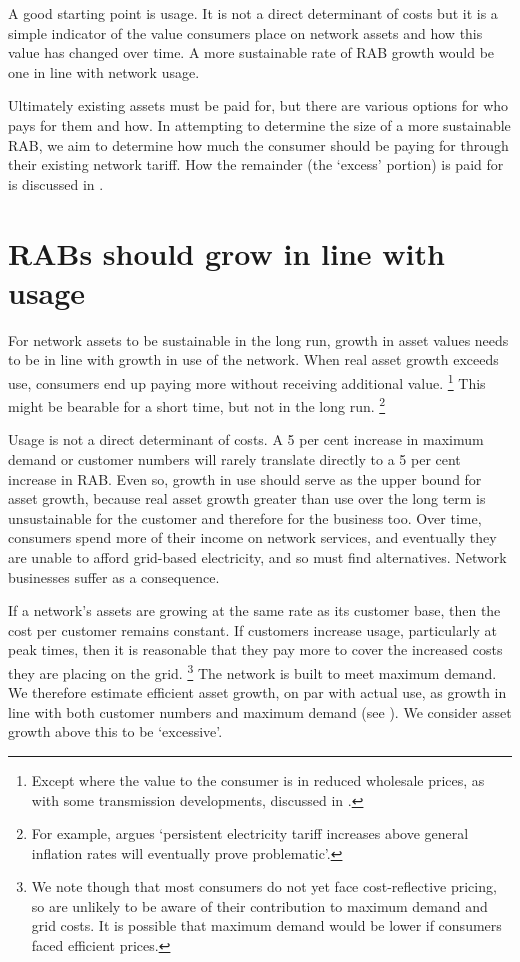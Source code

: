 \documentclass[FrontPage]{grattan}
\begin{document}
A good starting point is usage. It is not a direct determinant of costs but it is a simple indicator of the value consumers place on network assets and how this value has changed over time. A more sustainable rate of RAB growth would be one in line with network usage.

Ultimately existing assets must be paid for, but there are various options for who pays for them and how. In attempting to determine the size of a more sustainable RAB, we aim to determine how much the consumer should be paying for through their existing network tariff. How the remainder (the `excess' portion) is paid for is discussed in .

\section{RABs should grow in line with usage}\label{sec:RABs-should-grow-in-line-with-usage}

For network assets to be sustainable in the long run, growth in asset values needs to be in line with growth in use of the network. When real asset growth exceeds use, consumers end up paying more without receiving additional value.%
\footnote{Except where the value to the consumer is in reduced wholesale prices, as with some transmission developments, discussed in .}
This might be bearable for a short time, but not in the long run.%
\footnote{For example, \textcite{simshauser2017monopoly} argues `persistent electricity tariff increases above general inflation rates will eventually prove problematic'.}

Usage is not a direct determinant of costs. A 5 per cent increase in maximum demand or customer numbers will rarely translate directly to a 5 per cent increase in RAB\@. Even so, growth in use should serve as the upper bound for asset growth, because real asset growth greater than use over the long term is unsustainable for the customer and therefore for the business too. Over time, consumers spend more of their income on network services, and eventually they are unable to afford grid-based electricity, and so must find alternatives. Network businesses suffer as a consequence.

If a network's assets are growing at the same rate as its customer base, then the cost per customer remains constant. If customers increase usage, particularly at peak times, then it is reasonable that they pay more to cover the increased costs they are placing on the grid.%
\footnote{We note though that most consumers do not yet face cost-reflective pricing, so are unlikely to be aware of their contribution to maximum demand and grid costs. It is possible that maximum demand would be lower if consumers faced efficient prices.}
The network is built to meet maximum demand. We therefore estimate efficient asset growth, on par with actual use, as growth in line with both customer numbers and maximum demand (see ). We consider asset growth above this to be `excessive'.
\end{document}

